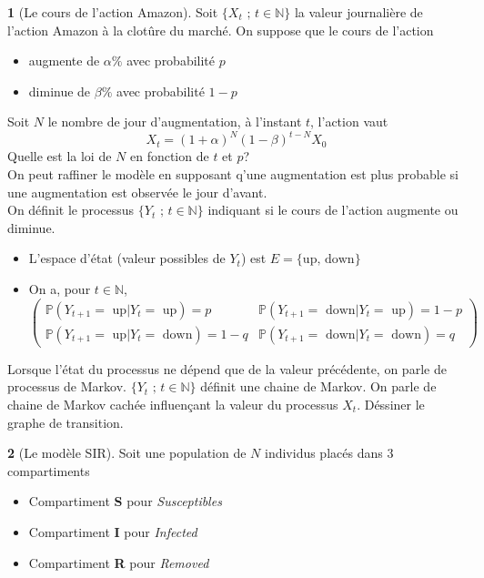 \documentclass[8pt,notheorems]{beamer}
\theoremstyle{definition}
\theoremstyle{example}
\newtheorem{example}{\translate{Example}}
\theoremstyle{mystyle}
\theoremstyle{plain}
\begin{document}
\begin{frame}[allowframebreaks]
\begin{example}[Le cours de l'action Amazon]
Soit $\{X_t\text{ ; }t\in\mathbb{N}\}$ la valeur journalière de l'action Amazon à la clotûre du marché. On suppose que le cours de l'action
\begin{itemize}
\item augmente de $\alpha\%$ avec probabilité $p$
\item diminue de $\beta\%$ avec probabilité $1-p$
\end{itemize}
Soit $N$ le nombre de jour d'augmentation, à l'instant $t$, l'action vaut
$$
X_t=(1+\alpha)^{N}(1-\beta)^{t-N}X_0
$$
Quelle est la loi de $N$ en fonction de $t$ et $p$?\\
On peut raffiner le modèle en supposant q'une augmentation est plus probable si une augmentation est observée le jour d'avant. \\
On définit le processus $\{Y_t\text{ ; }t\in\mathbb{N}\}$ indiquant si le cours de l'action augmente ou diminue.
\begin{itemize}
\item L'espace d'état (valeur possibles de $Y_t$) est $E=\{\text{up, down}\}$
\item On a, pour $t\in\mathbb{N}$,
$$
\left(
\begin{array}{cc}
\mathbb{P}(Y_{t+1}=\text{ up}|Y_{t}=\text{ up})=p& \mathbb{P}(Y_{t+1}=\text{ down}|Y_{t}=\text{ up})=1-p\\
\mathbb{P}(Y_{t+1}=\text{ up}|Y_{t}=\text{ down})=1-q& \mathbb{P}(Y_{t+1}=\text{ down}|Y_{t}=\text{ down})=q
\end{array}
\right)
$$
\end{itemize}
Lorsque l'état du processus ne dépend que de la valeur précédente, on parle de processus de Markov. $\{Y_t\text{ ; }t\in\mathbb{N}\}$ définit une chaine de Markov. On parle de chaine de Markov cachée influençant la valeur du processus $X_t$. Déssiner le graphe de transition.
\end{example}
\begin{example}[Le modèle SIR]
Soit une population de $N$ individus placés dans $3$ compartiments
\begin{itemize}
\item Compartiment \textbf{S} pour \textit{Susceptibles}
\item Compartiment \textbf{I} pour \textit{Infected}
\item Compartiment \textbf{R} pour \textit{Removed}
\end{itemize}

\end{example}
\end{frame}
\end{document}
